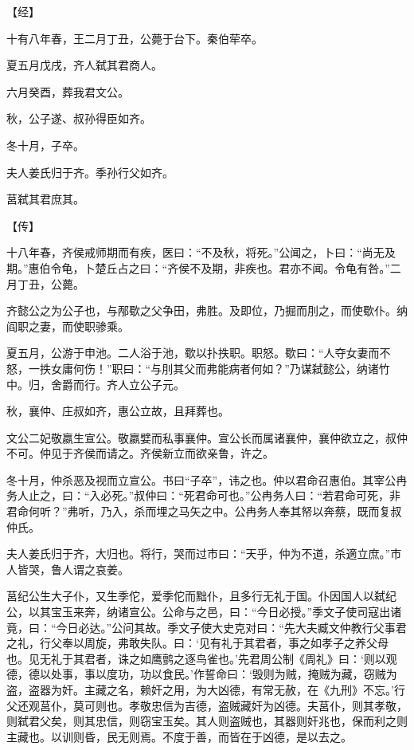 \documentclass[a4paper,12pt,UTF8,twoside]{ctexbook}
\begin{document}
【经】

十有八年春，王二月丁丑，公薨于台下。秦伯荦卒。

夏五月戊戌，齐人弑其君商人。

六月癸酉，葬我君文公。

秋，公子遂、叔孙得臣如齐。

冬十月，子卒。

夫人姜氏归于齐。季孙行父如齐。

莒弑其君庶其。

【传】

十八年春，齐侯戒师期而有疾，医曰：“不及秋，将死。”公闻之，卜曰：“尚无及期。”惠伯令龟，卜楚丘占之曰：“齐侯不及期，非疾也。君亦不闻。令龟有咎。”二月丁丑，公薨。

齐懿公之为公子也，与邴歜之父争田，弗胜。及即位，乃掘而刖之，而使歜仆。纳阎职之妻，而使职骖乘。

夏五月，公游于申池。二人浴于池，歜以扑抶职。职怒。歜曰：“人夺女妻而不怒，一抶女庸何伤！”职曰：“与刖其父而弗能病者何如？”乃谋弑懿公，纳诸竹中。归，舍爵而行。齐人立公子元。

秋，襄仲、庄叔如齐，惠公立故，且拜葬也。

文公二妃敬嬴生宣公。敬嬴嬖而私事襄仲。宣公长而属诸襄仲，襄仲欲立之，叔仲不可。仲见于齐侯而请之。齐侯新立而欲亲鲁，许之。

冬十月，仲杀恶及视而立宣公。书曰“子卒”，讳之也。仲以君命召惠伯。其宰公冉务人止之，曰：“入必死。”叔仲曰：“死君命可也。”公冉务人曰：“若君命可死，非君命何听？”弗听，乃入，杀而埋之马矢之中。公冉务人奉其帑以奔蔡，既而复叔仲氏。

夫人姜氏归于齐，大归也。将行，哭而过市曰：“天乎，仲为不道，杀適立庶。”市人皆哭，鲁人谓之哀姜。

莒纪公生大子仆，又生季佗，爱季佗而黜仆，且多行无礼于国。仆因国人以弑纪公，以其宝玉来奔，纳诸宣公。公命与之邑，曰：“今日必授。”季文子使司寇出诸竟，曰：“今日必达。”公问其故。季文子使大史克对曰：“先大夫臧文仲教行父事君之礼，行父奉以周旋，弗敢失队。曰：‘见有礼于其君者，事之如孝子之养父母也。见无礼于其君者，诛之如鹰鹯之逐鸟雀也。’先君周公制《周礼》曰：‘则以观德，德以处事，事以度功，功以食民。’作誓命曰：‘毁则为贼，掩贼为藏，窃贼为盗，盗器为奸。主藏之名，赖奸之用，为大凶德，有常无赦，在《九刑》不忘。’行父还观莒仆，莫可则也。孝敬忠信为吉德，盗贼藏奸为凶德。夫莒仆，则其孝敬，则弑君父矣，则其忠信，则窃宝玉矣。其人则盗贼也，其器则奸兆也，保而利之则主藏也。以训则昏，民无则焉。不度于善，而皆在于凶德，是以去之。
\end{document}
